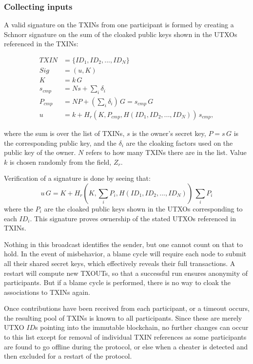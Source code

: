 \documentclass[a4paper, 10pt, conference]{ieeeconf}
\begin{document}
\subsubsection{Collecting inputs} 
A valid signature on the TXINs from one participant is formed by creating a Schnorr signature on the sum of the cloaked public keys shown in the UTXOs referenced in the TXINs:

\begin{align*}
TXIN &= \{ID_1, ID_2, ..., ID_N\}\\
Sig &= (u, K)\\
K &= k \, G \\
s_{cmp} &= N s + \sum_i{\delta_i}\\
P_{cmp} &= N P + (\sum_i{\delta_i})\, G = s_{cmp} \, G\\
u &= k + H_r(K, P_{cmp}, H(ID_1, ID_2, ..., ID_N)) \, s_{cmp},
\end{align*}

where the sum is over the list of TXINs, $s$ is the owner's secret key, $P = s \, G$ is the corresponding public key, and the $\delta_i$ are the cloaking factors used on the public key of the owner. $N$ refers to how many TXINs there are in the list. Value $k$ is chosen randomly from the field, $Z_r$. 

Verification of a signature is done by seeing that:
$$u \, G = K + H_r(K, \sum_i{P_i}, H(ID_1, ID_2, ..., ID_N)) \, \sum_i{P_i}$$
where the $P_i$ are the cloaked public keys shown in the UTXOs corresponding to each $ID_i$. This signature proves ownership of the stated UTXOs referenced in TXINs.

Nothing in this broadcast identifies the sender, but one cannot count on that to hold. In the event of misbehavior, a blame cycle will require each node to submit all their shared secret keys, which effectively reveals their full transactions. A restart will compute new TXOUTs, so that a successful run ensures anonymity of participants. But if a blame cycle is performed, there is no way to cloak the associations to TXINs again.

Once contributions have been received from each participant, or a timeout occurs, the resulting pool of TXINs is known to all participants. Since these are merely UTXO $ID$s pointing into the immutable blockchain, no further changes can occur to this list except for removal of individual TXIN references as some participants are found to go offline during the protocol, or else when a cheater is detected and then excluded for a restart of the protocol.
\end{document}
